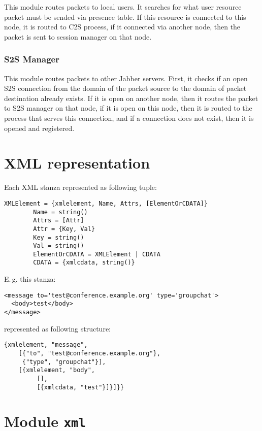 \documentclass[10pt]{article}
\newcommand{\Jabber}{Jabber}
\begin{document}
This module routes packets to local users.  It searches for what user resource
packet must be sended via presence table.  If this resource is connected to
this node, it is routed to C2S process, if it connected via another node, then
the packet is sent to session manager on that node.


\subsubsection{S2S Manager}

This module routes packets to other \Jabber{} servers.  First, it checks if an
open S2S connection from the domain of the packet source to the domain of
packet destination already exists. If it is open on another node, then it
routes the packet to S2S manager on that node, if it is open on this node, then
it is routed to the process that serves this connection, and if a connection
does not exist, then it is opened and registered.




\section{XML representation}
\label{sec:xmlrepr}

Each XML stanza represented as following tuple:
\begin{verbatim}
XMLElement = {xmlelement, Name, Attrs, [ElementOrCDATA]}
        Name = string()
        Attrs = [Attr]
        Attr = {Key, Val}
        Key = string()
        Val = string()
        ElementOrCDATA = XMLElement | CDATA
        CDATA = {xmlcdata, string()}
\end{verbatim}
E.\,g. this stanza:
\begin{verbatim}
<message to='test@conference.example.org' type='groupchat'>
  <body>test</body>
</message>
\end{verbatim}
represented as following structure:
\begin{verbatim}
{xmlelement, "message",
    [{"to", "test@conference.example.org"},
     {"type", "groupchat"}],
    [{xmlelement, "body",
         [],
         [{xmlcdata, "test"}]}]}}
\end{verbatim}



\section{Module \texttt{xml}}
\label{sec:xmlmod}
\end{document}
